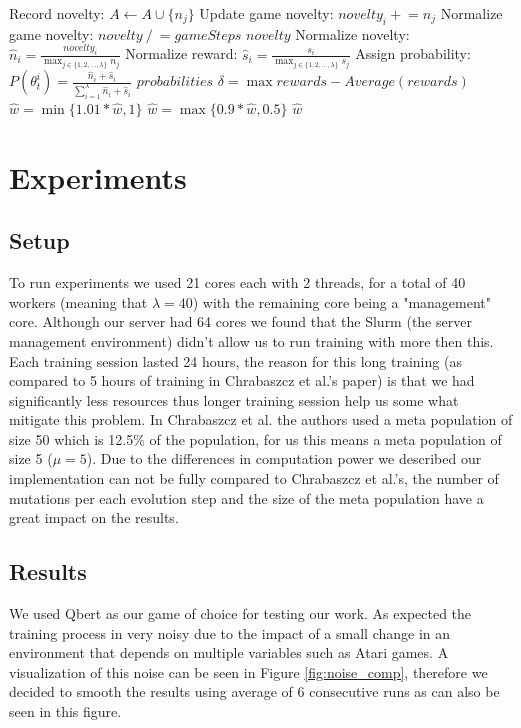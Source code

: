 \documentclass[11 pt, twocolumn]{article}
\begin{document}
\begin{algorithm}
\begin{algorithmic}[1]
	  	\State Record novelty: $A\gets A\cup \{n_j\}$
	  	\State Update game novelty: $novelty_i\mathrel{+}= n_j$
	\EndFor
	\State Normalize game novelty: $novelty\mathrel{/}=gameSteps$
	\State \Return $novelty$
\EndFunction
\Statex
{}
		\State Normalize novelty: $\hat{n}_i = \frac{novelty_i}{\max_{j\in\{1,2,\dots,\lambda\}}n_j}$
		\State Normalize reward: $\hat{s}_i = \frac{s_i}{\max_{j\in\{1,2,\dots,\lambda\}}s_j}$
		\State Assign probability: $P(\theta_t^i)=\frac{\hat{n}_i+\hat{s}_i}{\sum_{i=1}^{\lambda}\hat{n}_i+\hat{s}_i}$
	\EndFor
	\State \Return $probabilities$
\EndFunction
\Statex
{}
	\State $\delta = \max rewards - Average(rewards)$
		\State $\hat{w}=\min \{1.01*\hat{w},1\}$
	\Else
		\State $\hat{w}=\max \{0.9*\hat{w},0.5\}$
	\EndIf
	\State \Return $\hat{w}$
\EndFunction
\end{algorithmic}
\end{algorithm}

\section{Experiments}
\subsection{Setup}
To run experiments we used 21 cores each with 2 threads, for a total of 40 workers (meaning that $\lambda=40$) with the remaining core being a "management" core. Although our server had 64 cores we found that the Slurm (the server management environment) didn't allow us to run training with more then this. Each training session lasted 24 hours, the reason for this long training (as compared to 5 hours of training in Chrabaszcz et al.'s paper) is that we had significantly less resources thus longer training session help us some what mitigate this problem. In Chrabaszcz et al. the authors used a meta population of size 50 which is 12.5\% of the population, for us this means a meta population of size 5 ($\mu=5$). Due to the differences in computation power we described our implementation can not be fully compared to Chrabaszcz et al.'s, the number of mutations per each evolution step and the size of the meta population have a great impact on the results.
\subsection{Results}
We used Qbert as our game of choice for testing our work. As expected the training process in very noisy due to the impact of a small change in an environment that depends on multiple variables such as Atari games. A visualization of this noise can be seen in Figure \ref{fig:noise_comp}, therefore we decided to smooth the results using average of 6 consecutive runs as can also be seen in this figure.
\end{document}
